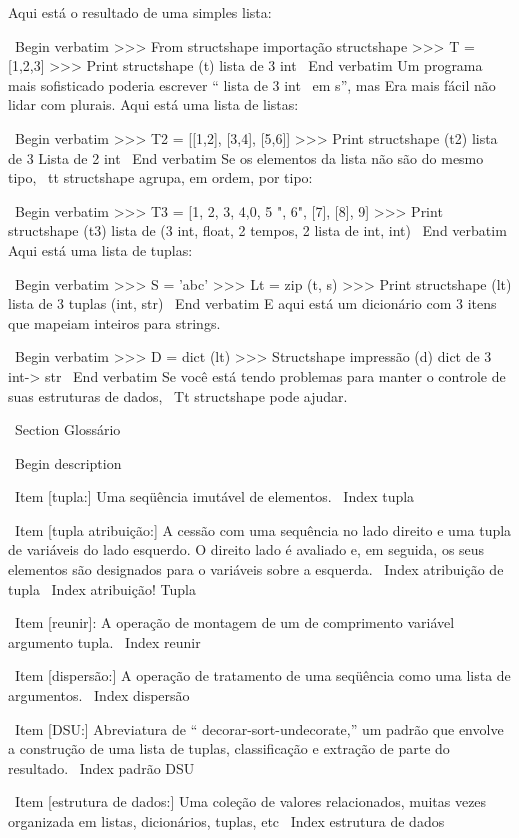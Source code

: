 \documentclass[10pt]{book}
\begin{document}
{{{{{{{{{Aqui está o resultado de uma simples lista:

\ Begin {verbatim}
>>> From structshape importação structshape
>>> T = [1,2,3]
>>> Print structshape (t)
lista de 3 int
\ End {verbatim}
%
Um programa mais sofisticado poderia escrever `` lista de 3 int {\ em s}'', mas
Era mais fácil não lidar com plurais. Aqui está uma lista de listas:

\ Begin {verbatim}
>>> T2 = [[1,2], [3,4], [5,6]]
>>> Print structshape (t2)
lista de 3 Lista de 2 int
\ End {verbatim}
%
Se os elementos da lista não são do mesmo tipo,
{\ tt structshape} agrupa, em ordem, por tipo:

\ Begin {verbatim}
>>> T3 = [1, 2, 3, 4,0, 5 ", 6", [7], [8], 9]
>>> Print structshape (t3)
lista de (3 int, float, 2 tempos, 2 lista de int, int)
\ End {verbatim}
%
Aqui está uma lista de tuplas:

\ Begin {verbatim}
>>> S = 'abc'
>>> Lt = zip (t, s)
>>> Print structshape (lt)
lista de 3 tuplas (int, str)
\ End {verbatim}
%
E aqui está um dicionário com 3 itens que mapeiam inteiros para strings.

\ Begin {verbatim}
>>> D = dict (lt) 
>>> Structshape impressão (d)
dict de 3 int-> str
\ End {verbatim}
%
Se você está tendo problemas para manter o controle de suas estruturas de dados,
{\ Tt structshape} pode ajudar.


\ Section {} Glossário

\ Begin {description}

\ Item [tupla:] Uma seqüência imutável de elementos.
\ Index {} tupla

\ Item [tupla atribuição:] A cessão com uma sequência no
lado direito e uma tupla de variáveis ​​do lado esquerdo. O direito
lado é avaliado e, em seguida, os seus elementos são designados para o
variáveis ​​sobre a esquerda.
\ Index {atribuição de tupla}
\ Index {atribuição! Tupla}

\ Item [reunir]: A operação de montagem de um de comprimento variável
argumento tupla.
\ Index {reunir}

\ Item [dispersão:] A operação de tratamento de uma seqüência como uma lista de
argumentos.
\ Index {dispersão}

\ Item [DSU:] Abreviatura de `` decorar-sort-undecorate,'' um
padrão que envolve a construção de uma lista de tuplas, classificação e
extração de parte do resultado.
\ Index {padrão DSU}

\ Item [estrutura de dados:] Uma coleção de valores relacionados, muitas vezes
organizada em listas, dicionários, tuplas, etc
\ Index {estrutura de dados}

}}}}}}}}}
\end{document}
